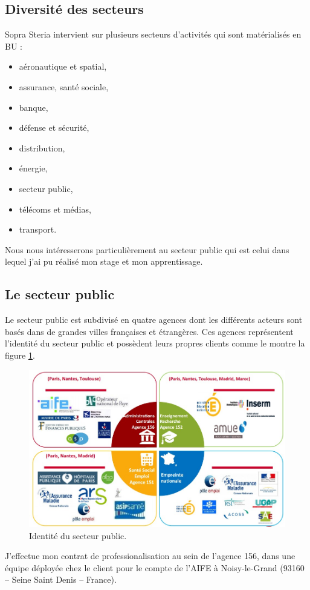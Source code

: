\documentclass[12pt,a4paper]{article}
\begin{document}
\subsection{Diversité des secteurs}
Sopra Steria intervient sur plusieurs secteurs d’activités qui sont matérialisés en \gls{BU} :
\smallbreak
\begin{itemize}
\item aéronautique et spatial,
\item assurance, santé sociale,
\item banque,
\item défense et sécurité,
\item distribution,
\item énergie,
\item secteur public,
\item télécoms et médias,
\item transport.
\end{itemize}
\medbreak
Nous nous intéresserons particulièrement au secteur public qui est celui dans lequel j'ai pu réalisé mon stage et mon apprentissage.
\subsection{Le secteur public}
Le secteur public est subdivisé en quatre agences dont les différents acteurs sont basés dans de grandes villes françaises et étrangères. Ces agences représentent l'identité du secteur public et possèdent leurs propres clients comme le montre la figure \ref{agences}.
\begin{figure}[H]
	\begin{center}
		\includegraphics[width=\textwidth,keepaspectratio]{identiteSecteurPublic.png}
		\caption{Identité du secteur public.}
		\label{agences}
	\end{center}
\end{figure}
J’effectue mon contrat de professionalisation au sein de l'agence 156, dans une équipe déployée chez le client pour le compte de l’AIFE à Noisy-le-Grand (93160 – Seine Saint Denis – France).
\newpage
\clearpage
\end{document}
